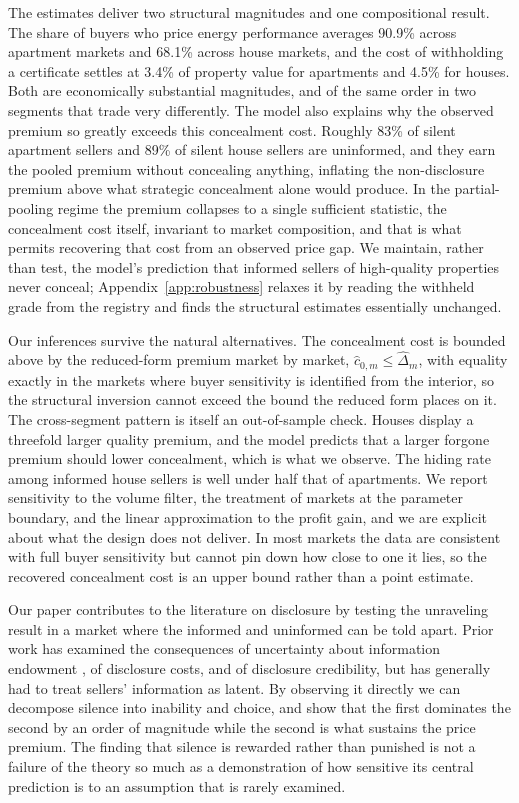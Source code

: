 The estimates deliver two structural magnitudes and one compositional result. The share of buyers
who price energy performance averages 90.9\% across apartment markets and 68.1\% across house
markets, and the cost of withholding a certificate settles at 3.4\% of property value for
apartments and 4.5\% for houses. Both are economically substantial magnitudes, and of the same order
in two segments that trade very differently. The model also explains why the observed premium so greatly exceeds this
concealment cost. Roughly 83\% of silent apartment sellers and 89\% of silent house sellers are
uninformed, and they earn the pooled premium without concealing anything, inflating the
non-disclosure premium above what strategic concealment alone would produce. In the partial-pooling
regime the premium collapses to a single sufficient statistic, the concealment cost itself,
invariant to market composition, and that is what permits recovering that cost from an observed
price gap. We maintain, rather than test, the model's prediction that informed sellers of
high-quality properties never conceal; Appendix~\ref{app:robustness} relaxes it by reading the
withheld grade from the registry and finds the structural estimates essentially unchanged.

Our inferences survive the natural alternatives. The concealment cost is bounded above by the
reduced-form premium market by market, $\hat c_{0,m}\leq\hat\Delta_m$, with equality exactly in
the markets where buyer sensitivity is identified from the interior, so the structural inversion
cannot exceed the bound the reduced form places on it. The cross-segment pattern is itself an out-of-sample check. Houses display a
threefold larger quality premium, and the model predicts that a larger forgone premium should
lower concealment, which is what we observe. The hiding rate among informed house sellers is
well under half that of apartments. We report sensitivity to the volume filter, the treatment of markets at
the parameter boundary, and the linear approximation to the profit gain, and we are explicit
about what the design does not deliver. In most markets the data are consistent with full buyer
sensitivity but cannot pin down how close to one it lies, so the recovered concealment cost is an
upper bound rather than a point estimate.

Our paper contributes to the literature on disclosure by testing the unraveling result in a
market where the informed and uninformed can be told apart. Prior work has examined the
consequences of uncertainty about information endowment \citep{dye_disclosure_1985,
jung_kwon_1988}, of disclosure costs, and of disclosure credibility, but has generally had to
treat sellers' information as latent. By observing it directly we can decompose silence into
inability and choice, and show that the first dominates the second by an order of magnitude
while the second is what sustains the price premium. The finding that silence is rewarded rather
than punished is not a failure of the theory so much as a demonstration of how sensitive its
central prediction is to an assumption that is rarely examined.

